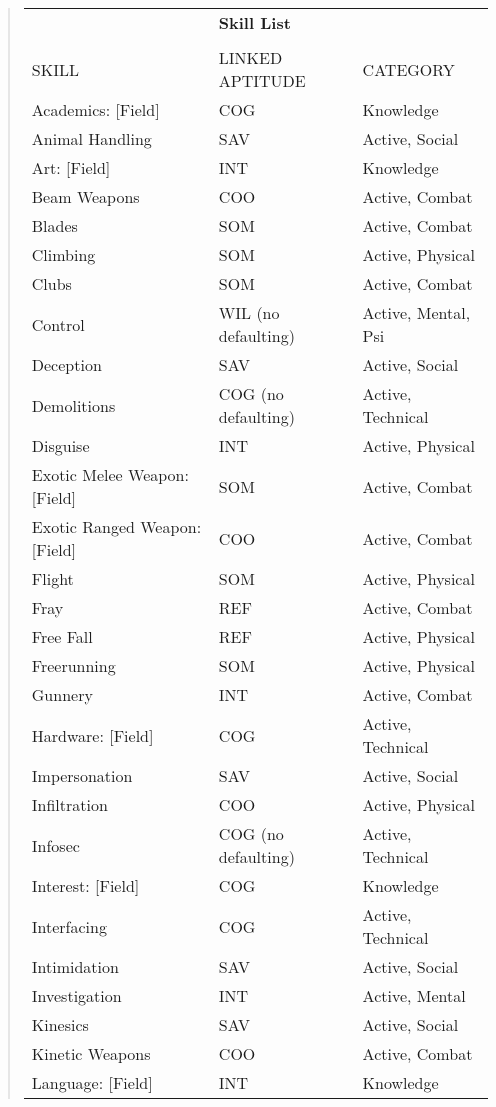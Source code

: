 \begin{quotation}
\begin{tabular}{lll}
& \textbf{Skill List} &\\
\\
SKILL &  LINKED APTITUDE  & CATEGORY\\
Academics: [Field] & COG & Knowledge\\
Animal Handling & SAV & Active, Social\\
Art: [Field] & INT & Knowledge\\
Beam Weapons & COO & Active, Combat\\
Blades & SOM & Active, Combat\\
Climbing & SOM & Active, Physical\\
Clubs & SOM & Active, Combat\\
Control & WIL (no defaulting) & Active, Mental, Psi\\
Deception & SAV & Active, Social\\
Demolitions & COG (no defaulting) & Active, Technical\\
Disguise & INT & Active, Physical\\
Exotic Melee Weapon: [Field] & SOM & Active, Combat\\
Exotic Ranged Weapon: [Field] & COO & Active, Combat\\
Flight & SOM & Active, Physical\\
Fray & REF & Active, Combat\\
Free Fall & REF & Active, Physical\\
Freerunning & SOM & Active, Physical\\
Gunnery & INT & Active, Combat\\
Hardware: [Field] & COG & Active, Technical\\
Impersonation & SAV & Active, Social\\
Infiltration & COO & Active, Physical\\
Infosec & COG (no defaulting) & Active, Technical\\
Interest: [Field] & COG & Knowledge\\
Interfacing & COG & Active, Technical\\
Intimidation & SAV & Active, Social\\
Investigation & INT & Active, Mental\\
Kinesics & SAV & Active, Social\\
Kinetic Weapons & COO & Active, Combat\\
Language: [Field] & INT & Knowledge\\

\end{tabular}
\end{quotation}
